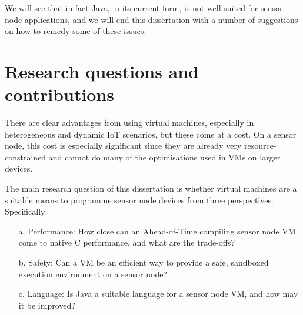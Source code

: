 We will see that in fact Java, in its current form, is not well suited for sensor node applications, and we will end this dissertation with a number of suggestions on how to remedy some of these issues.


\newpage
\section{Research questions and contributions}
\label{sec-introduction-research-questions}
There are clear advantages from using virtual machines, especially in heterogeneous and dynamic IoT scenarios, but these come at a cost. On a sensor node, this cost is especially significant since they are already very resource-constrained and cannot do many of the optimisations used in VMs on larger devices.

The main research question of this dissertation is whether virtual machines are a suitable means to programme sensor node devices from three perspectives.
Specifically:
\begin{enumerate}
    \item[a.] Performance: How close can an Ahead-of-Time compiling sensor node VM come to native C performance, and what are the trade-offs?
    \item[b.] Safety: Can a VM be an efficient way to provide a safe, sandboxed execution environment on a sensor node?
    \item[c.] Language: Is Java a suitable language for a sensor node VM, and how may it be improved?
\end{enumerate}

